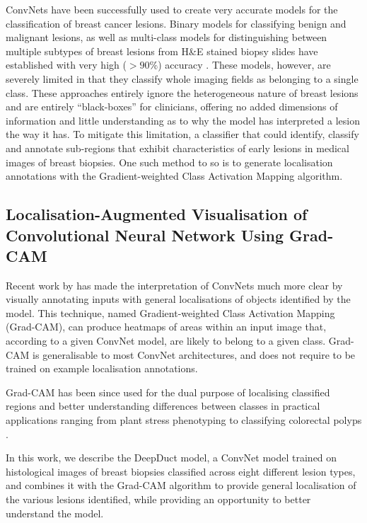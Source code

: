 ConvNets have been successfully used to create very accurate models for the classification of breast cancer lesions. Binary models for classifying benign and malignant lesions, as well as multi-class models for distinguishing between multiple subtypes of breast lesions from H\&E stained biopsy slides have established with very high ($>90\%$) accuracy \citep{wei2017, han2017}. These models, however, are severely limited in that they classify whole imaging fields as belonging to a single class. These approaches entirely ignore the heterogeneous nature of breast lesions and are entirely ``black-boxes'' for clinicians, offering no added dimensions of information and little understanding as to why the model has interpreted a lesion the way it has. To mitigate this limitation, a classifier that could identify, classify and annotate sub-regions that exhibit characteristics of early lesions in medical images of breast biopsies. One such method to so is to generate localisation annotations with the Gradient-weighted Class Activation Mapping algorithm. \par

\subsection{Localisation-Augmented Visualisation of Convolutional Neural Network Using Grad-CAM}

Recent work by \citeauthor{selvaraju2016} has made the interpretation of ConvNets much more clear by visually annotating inputs with general localisations of objects identified by the model. This technique, named Gradient-weighted Class Activation Mapping (Grad-CAM), can produce heatmaps of areas within an input image that, according to a given ConvNet model, are likely to belong to a given class. Grad-CAM is generalisable to most ConvNet architectures, and does not require to be trained on example localisation annotations.\par

Grad-CAM has been since used for the dual purpose of localising classified regions and better understanding differences between classes in practical applications ranging from plant stress phenotyping to classifying colorectal polyps \citep{ghosal2017,korbar2017}.\par

In this work, we describe the DeepDuct model, a ConvNet model trained on histological images of breast biopsies classified across eight different lesion types, and combines it with the Grad-CAM algorithm to provide general localisation of the various lesions identified, while providing an opportunity to better understand the model.